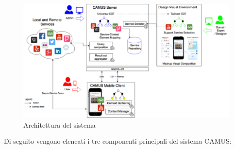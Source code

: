 \begin{figure}[ht]
	\centering
	\includegraphics[width=\textwidth]{4-metodologia/Immagini/architettura-generale.png}
	\caption{Architettura del sistema}\label{fig:architettura-sistema}
\end{figure}

Di seguito vengono elencati i tre componenti principali del sistema CAMUS:

